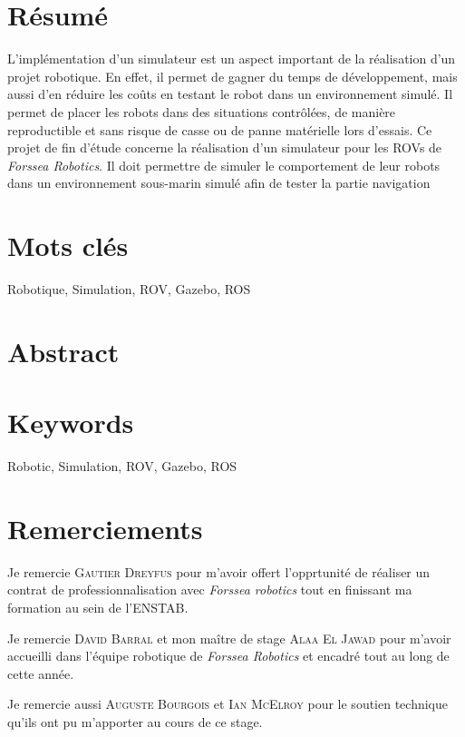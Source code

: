 \section*{Résumé}
	L'implémentation d'un simulateur est un aspect important de la réalisation d'un projet robotique. En effet, il permet de gagner du temps de développement, mais aussi d'en réduire les coûts en testant le robot dans un environnement simulé. Il permet de placer les robots dans des situations contrôlées, de manière reproductible et sans risque de casse ou de panne matérielle lors d'essais.
	Ce projet de fin d'étude concerne la réalisation d'un simulateur pour les \gls{ROV}s de \textit{Forssea Robotics}. Il doit permettre de simuler le comportement de leur robots dans un environnement sous-marin simulé afin de tester la partie navigation 

\section*{Mots clés}
Robotique, Simulation, ROV, Gazebo, ROS

\section*{Abstract}
	
\section*{Keywords}
Robotic, Simulation, ROV, Gazebo, ROS


\section*{Remerciements}

Je remercie \textsc{Gautier Dreyfus} pour m'avoir offert l'opprtunité de réaliser un contrat de professionnalisation avec \textit{Forssea robotics} tout en finissant ma formation au sein de l'\gls{ENSTAB}.

Je remercie \textsc{David Barral} et mon maître de stage \textsc{Alaa El Jawad} pour m'avoir accueilli dans l'équipe robotique de \textit{Forssea Robotics} et encadré tout au long de cette année.

Je remercie aussi \textsc{Auguste Bourgois} et \textsc{Ian McElroy} pour le soutien technique qu'ils ont pu m'apporter au cours de ce stage.